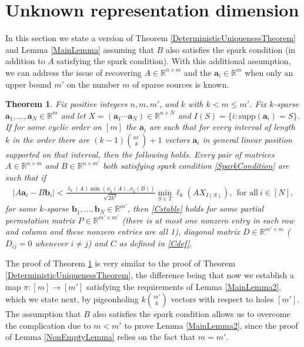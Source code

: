 \documentclass[journal, onecolumn]{IEEEtran}
\newtheorem{theorem}{Theorem}
\begin{document}

\section{Unknown representation dimension}\label{mleqm}

In this section we state a version of Theorem \ref{DeterministicUniquenessTheorem} and Lemma \ref{MainLemma} assuming that $B$ also satisfies the spark condition (in addition to $A$ satisfying the spark condition). With this additional assumption, we can address the issue of recovering $A \in \mathbb{R}^{n \times m}$ and the $\mathbf{a}_i \in \mathbb{R}^m$ when only an upper bound $m'$ on the number $m$ of sparse sources is known.

\begin{theorem}\label{DeterministicUniquenessTheorem2}
Fix positive integers $n, m, m'$, and $k$ with $k < m \leq m'$. Fix $k$-sparse $\mathbf{a}_1, \ldots, \mathbf{a}_N \in \mathbb{R}^m$ and let $X  = (\mathbf{a}_1 \cdots \mathbf{a}_N) \in \mathbb{R}^{n \times N}$ and $I(S) = \{i : \text{supp}(\mathbf{a}_i) = S\}$. If for some cyclic order on $[m]$ the $\mathbf{a}_i$ are such that for every interval of length $k$ in the order there are $(k-1){m' \choose k}+1$ vectors $\mathbf{a}_i$ in general linear position supported on that interval, then the following holds. Every pair of matrices $A \in \mathbb{R}^{n \times m}$ and $B \in \mathbb{R}^{n \times m'}$ both satisfying spark condition \eqref{SparkCondition} are such that if 
\begin{align}
|A\mathbf{a}_i - B\mathbf{b}_i| < \frac{ \ell_{k}(A) \min(\phi_k(A), \phi_k(B))}{\sqrt{2k^3} } \min_{S \in T} \ell_k(AX_{I(S)}), \ \  \text{for all} \  i \in [N],
\end{align}
%
for some $k$-sparse $\mathbf{b}_1, \ldots, \mathbf{b}_N \in \mathbb{R}^{m'}$, then \eqref{Cstable} holds for some partial permutation matrix $P \in \mathbb{R}^{m' \times m'}$ (there is at most one nonzero entry in each row and column and these nonzero entries are all 1), diagonal matrix $D \in \mathbb{R}^{m' \times m}$ ($D_{ij} = 0$ whenever $i \neq j$) and $C$ as defined in \eqref{Cdef}. 
\end{theorem}

The proof of Theorem \ref{DeterministicUniquenessTheorem2} is very similar to the proof of Theorem \ref{DeterministicUniquenessTheorem}, the difference being that now we establish a map $\pi: [m] \to [m']$ satisfying the requirements of Lemma \ref{MainLemma2}, which we state next, by pigeonholing $k{m' \choose k}$ vectors with respect to holes $[m']$. The assumption that $B$ also satisfies the spark condition allows us to overcome the complication due to $m < m'$ to prove Lemma \ref{MainLemma2}, since the proof of Lemma \ref{NonEmptyLemma} relies on the fact that $m = m'$. 
\end{document}

